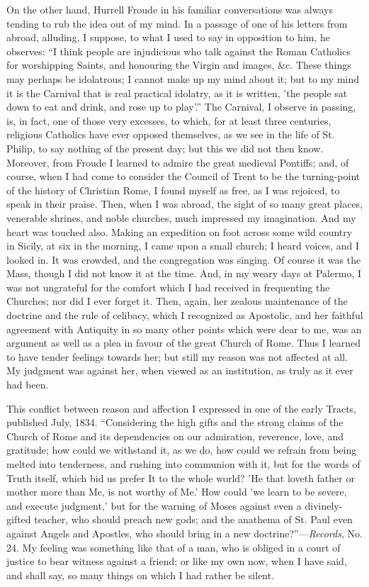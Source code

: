 On the other hand, Hurrell Froude in his familiar conversations was
always tending to rub the idea out of my mind. In a passage of one of
his letters from abroad, alluding, I suppose, to what I used to say in
opposition to him, he observes: ``I think people are injudicious who
talk against the Roman Catholics for worshipping Saints, and honouring
the Virgin and images, \&c. These things may perhaps be idolatrous; I
cannot make up my mind about it; but to my mind it is the Carnival that
is real practical idolatry, as it is written, 'the people sat down to
eat and drink, and rose up to play'.'' The Carnival, I observe in
passing, is, in fact, one of those very excesses, to which, for at least
three centuries, religious Catholics have ever opposed themselves, as we
see in the life of St. Philip, to say nothing of the present day; but
this we did not then know. Moreover, from Froude I learned to
admire the great medieval Pontiffs; and, of course, when I had come to
consider the Council of Trent to be the turning-point of the history of
Christian Rome, I found myself as free, as I was rejoiced, to speak in
their praise. Then, when I was abroad, the sight of so many great
places, venerable shrines, and noble churches, much impressed my
imagination. And my heart was touched also. Making an expedition on foot
across some wild country in Sicily, at six in the morning, I came upon a
small church; I heard voices, and I looked in. It was crowded, and the
congregation was singing. Of course it was the Mass, though I did not know it at the time. And, in my weary days at Palermo, I was not
ungrateful for the comfort which I had received in frequenting the
Churches; nor did I ever forget it. Then, again, her zealous maintenance
of the doctrine and the rule of celibacy, which I recognized as
Apostolic, and her faithful agreement with Antiquity in so many other
points which were dear to me, was an argument as well as a
plea in favour of the great Church of Rome. Thus I learned to have
tender feelings towards her; but still my reason was not affected at
all. My judgment was against her, when viewed as an institution, as
truly as it ever had been.

This conflict between reason and affection I expressed in one of the
early Tracts, published July, 1834. ``Considering the high gifts and
the strong claims of the Church of Rome and its dependencies on our
admiration, reverence, love, and gratitude; how could we withstand it,
as we do, how could we refrain from being melted into tenderness, and
rushing into communion with it, but for the words of Truth itself, which
bid us prefer It to the whole world? 'He that loveth father or mother
more than Me, is not worthy of Me.' How could 'we learn to be severe,
and execute judgment,' but for the warning of Moses against even a
divinely-gifted teacher, who should preach new gods; and the anathema of
St. Paul even against Angels and Apostles, who should bring in a new
doctrine?''—\emph{Records}, No. 24. My feeling was something like
that of a man, who is obliged in a court of justice to bear witness
against a friend; or like my own now, when I have said, and shall say,
so many things on which I had rather be silent.

